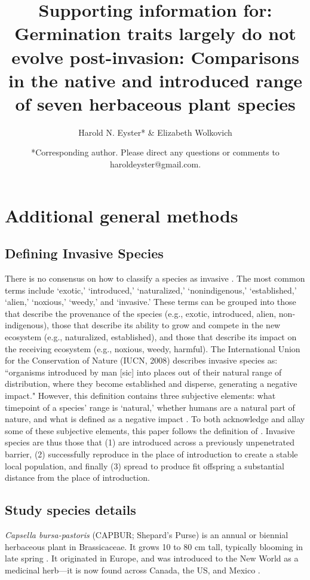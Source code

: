 \documentclass[12pt]{article}\usepackage[]{graphicx}\usepackage[]{color}
\title{\textbf{Supporting information for:}  \\ \bigskip Germination traits largely do not evolve post-invasion: Comparisons in the native and introduced range of seven herbaceous plant species}\author{Harold N. Eyster* \&  Elizabeth Wolkovich}
\date{*Corresponding author. Please direct any questions or comments to haroldeyster@gmail.com. }
\begin{document}
\maketitle
\tableofcontents
\section{Additional general methods}
\subsection{Defining Invasive Species}
There is no consensus on how to classify a species as invasive \parencite{Colautti2004}. The most common terms include `exotic,' `introduced,' `naturalized,' `nonindigenous,' `established,' `alien,' `noxious,' `weedy,' and `invasive.' These terms can be grouped into those that describe the provenance of the species (e.g., exotic, introduced, alien, non-indigenous), those that describe its ability to grow and compete in the new ecosystem (e.g., naturalized, established), and those that describe its impact on the receiving ecosystem (e.g., noxious, weedy, harmful). The International Union for the Conservation of Nature (IUCN, 2008) describes invasive species as: ``organisms introduced by man [sic] into places out of their natural range of distribution, where they become established and disperse, generating a negative impact." \nocite{IUCN2008is} However, this definition contains three subjective elements: what timepoint of a species' range is `natural,' whether humans are a natural part of nature, and what is defined as a negative impact \parencite{Munro2019}. To both acknowledge and allay some of these subjective elements, this paper follows the definition of \textcite{Richardson2000,Richardson2011}. Invasive species are thus those that (1) are introduced across a previously unpenetrated barrier, (2) successfully reproduce in the place of introduction to create a stable local population, and finally (3) spread to produce fit offspring a substantial distance from the place of introduction.

\subsection{Study species details}
\textit{Capsella bursa-pastoris} (CAPBUR; Shepard's Purse) is an annual or biennial herbaceous plant in Brassicaceae. It grows 10 to 80 cm tall, typically blooming in late spring \parencite{Defelice2001}. It originated in Europe, and was introduced to the New World as a medicinal herb---it is now found across Canada, the US, and Mexico \parencite{Westrich1989}.
	
\end{document}
